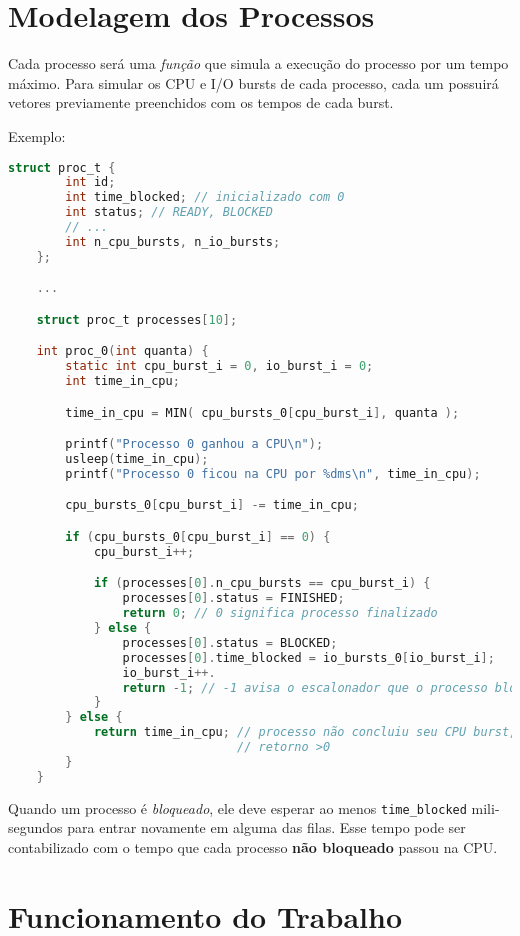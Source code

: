 \documentclass[a4paper, oneside,12pt]{article}
\begin{document}
\section{Modelagem dos Processos}

Cada processo será uma \emph{função} que simula a execução do processo por
um tempo máximo. Para simular os CPU e I/O bursts de cada processo, cada um
possuirá vetores previamente preenchidos com os tempos de cada burst.

Exemplo:

\begin{lstlisting}[language=C]
    struct proc_t {
        int id;
        int time_blocked; // inicializado com 0
        int status; // READY, BLOCKED
        // ...
        int n_cpu_bursts, n_io_bursts;
    };

    ...

    struct proc_t processes[10];

    int proc_0(int quanta) {
        static int cpu_burst_i = 0, io_burst_i = 0;
        int time_in_cpu;

        time_in_cpu = MIN( cpu_bursts_0[cpu_burst_i], quanta );

        printf("Processo 0 ganhou a CPU\n");
        usleep(time_in_cpu);
        printf("Processo 0 ficou na CPU por %dms\n", time_in_cpu);

        cpu_bursts_0[cpu_burst_i] -= time_in_cpu;

        if (cpu_bursts_0[cpu_burst_i] == 0) {
            cpu_burst_i++;

            if (processes[0].n_cpu_bursts == cpu_burst_i) {
                processes[0].status = FINISHED;
                return 0; // 0 significa processo finalizado
            } else {
                processes[0].status = BLOCKED;
                processes[0].time_blocked = io_bursts_0[io_burst_i];
                io_burst_i++.
                return -1; // -1 avisa o escalonador que o processo bloqueou
            }
        } else {
            return time_in_cpu; // processo não concluiu seu CPU burst,
                                // retorno >0
        }
    }
\end{lstlisting}

Quando um processo é \emph{bloqueado}, ele deve esperar ao menos \texttt{time\_blocked} mili-segundos para entrar novamente em alguma das filas. Esse tempo pode ser contabilizado com o tempo que cada processo \textbf{não bloqueado} passou na CPU.

\section{Funcionamento do Trabalho}
\label{sec:func}
\end{document}
